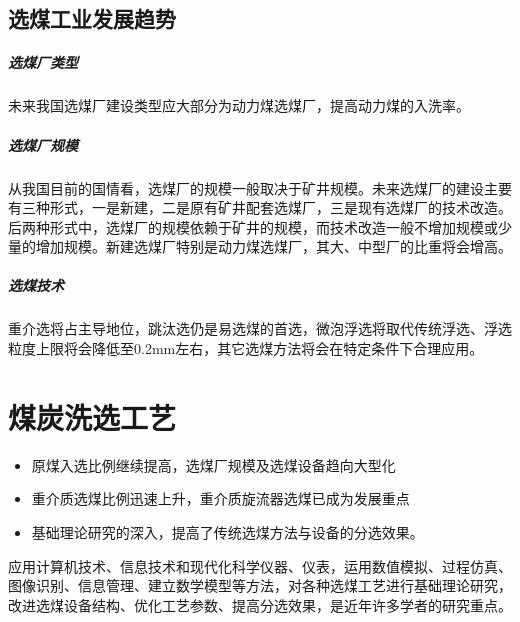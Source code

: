 \documentclass[10pt,openany]{ctexbook}
\begin{document}
    \subsection{选煤工业发展趋势}
    \subparagraph{选煤厂类型} 未来我国选煤厂建设类型应大部分为动力煤选煤厂，提高动力煤的入洗率。
    \subparagraph{选煤厂规模}  从我国目前的国情看，选煤厂的规模一般取决于矿井规模。未来选煤厂的建设主要有三种形式，一是新建，二是原有矿井配套选煤厂，三是现有选煤厂的技术改造。后两种形式中，选煤厂的规模依赖于矿井的规模，而技术改造一般不增加规模或少量的增加规模。新建选煤厂特别是动力煤选煤厂，其大、中型厂的比重将会增高。
    \subparagraph{选煤技术} 重介选将占主导地位，跳汰选仍是易选煤的首选，微泡浮选将取代传统浮选、浮选粒度上限将会降低至0.2mm左右，其它选煤方法将会在特定条件下合理应用。
\section{煤炭洗选工艺}
\begin{itemize}
\item 原煤入选比例继续提高，选煤厂规模及选煤设备趋向大型化
\item  重介质选煤比例迅速上升，重介质旋流器选煤已成为发展重点
 \item 基础理论研究的深入，提高了传统选煤方法与设备的分选效果。

\end{itemize}

应用计算机技术、信息技术和现代化科学仪器、仪表，运用数值模拟、过程仿真、图像识别、信息管理、建立数学模型等方法，对各种选煤工艺进行基础理论研究，改进选煤设备结构、优化工艺参数、提高分选效果，是近年许多学者的研究重点。
\end{document}
